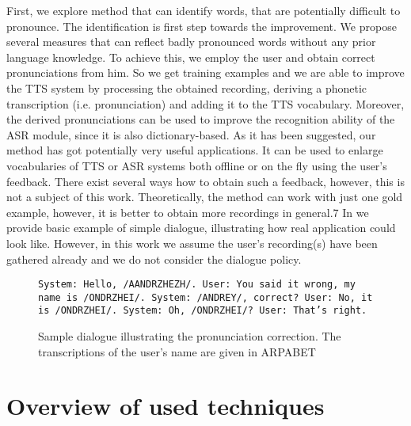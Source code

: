 First, we explore method that can identify words, that are potentially difficult to pronounce.
The identification is first step towards the improvement.
We propose several measures that can reflect badly pronounced words without any prior language knowledge.
To achieve this, we employ the user and obtain correct pronunciations from him.
So we get training examples and we are able to improve the TTS system by processing the obtained recording, deriving a phonetic transcription (i.e. pronunciation) and adding it to the TTS vocabulary.
Moreover, the derived pronunciations can be used to improve the recognition ability of the ASR module, since it is also dictionary-based.
As it has been suggested, our method has got potentially very useful applications.
It can be used to enlarge vocabularies of TTS or ASR systems both offline or on the fly using the user's feedback.
There exist several ways how to obtain such a feedback, however, this is not a subject of this work.
Theoretically, the method can work with just one gold example, however, it is better to obtain more recordings in general.7
In  we provide basic example of simple dialogue, illustrating how real application could look like.
However, in this work we assume the user's recording(s) have been gathered already and we do not consider the dialogue policy.
\begin{center}
\begin{figure}[h]
\texttt{System: Hello, /AANDRZHEZH/.\linebreak
User: You said it wrong, my name is /ONDRZHEI/.\linebreak
System: /ANDREY/, correct?\linebreak
User: No, it is /ONDRZHEI/.\linebreak
System: Oh, /ONDRZHEI/?\linebreak
User: That's right.
}
\caption{Sample dialogue illustrating the pronunciation correction. The transcriptions of the user's name are given in ARPABET\cite{Arpabet}}
\label{dialogsample}
\end{figure}
\end{center}

\section{Overview of used techniques}
